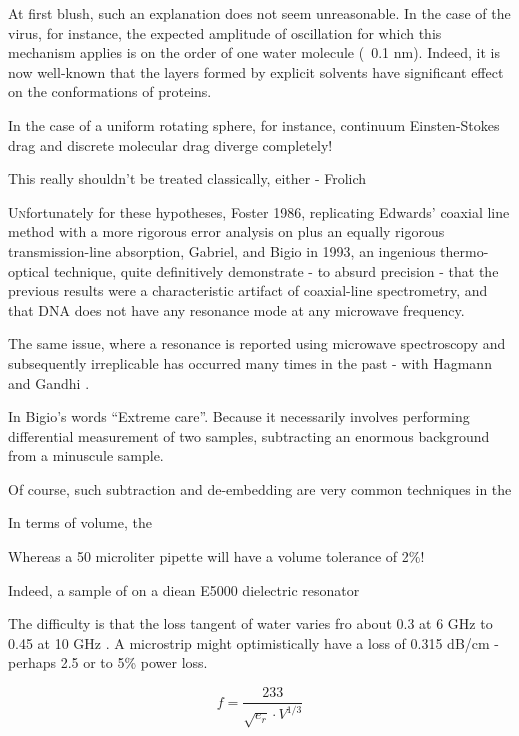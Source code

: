 \documentclass[paper.tex]{subfiles}
\begin{document}
\begin{multicols}{1}
At first blush, such an explanation does not seem unreasonable. In the case of the virus, for instance, the expected amplitude of oscillation for which this mechanism applies is on the order of one water molecule (~0.1 nm). Indeed, it is now well-known that the layers formed by explicit solvents have significant effect on the conformations of proteins.

In the case of a uniform rotating sphere\cite{Molecular1963}, for instance, continuum Einsten-Stokes drag and discrete molecular drag diverge completely!

This really shouldn’t be treated classically, either - Frolich 

\lettrine{U}nfortunately for these hypotheses, Foster 1986, replicating Edwards’ coaxial line method with a more rigorous error analysis on plus an equally rigorous transmission-line absorption, Gabriel, and Bigio in 1993, an ingenious thermo-optical technique, quite definitively demonstrate - to absurd precision -  that the previous results were a characteristic artifact of coaxial-line spectrometry, and that DNA does not have any resonance mode at any microwave frequency.

The same issue, where a resonance is reported using microwave spectroscopy and subsequently irreplicable has occurred many times in the past - with Hagmann and Gandhi \cite{Substitution1982}. 

In Bigio’s words “Extreme care”. Because it necessarily involves performing differential measurement of two samples, subtracting an enormous background from a minuscule sample.

Of course, such subtraction and de-embedding are very common techniques in the 

In terms of volume, the 


Whereas a 50 microliter pipette will have a volume tolerance of 2\%! 




Indeed, a sample of on a diean E5000 dielectric resonator 

The difficulty is that the loss tangent of water varies fro about 0.3 at 6 GHz to 0.45 at 10 GHz \cite{Metamaterial2015}. A microstrip might optimistically have a loss of 0.315 dB/cm - perhaps 2.5 or to 5\% power loss. 

$$f = \frac{233}{\sqrt{e_r}\cdot{V^{1/3}}}$$






\end{multicols}
\end{document}
